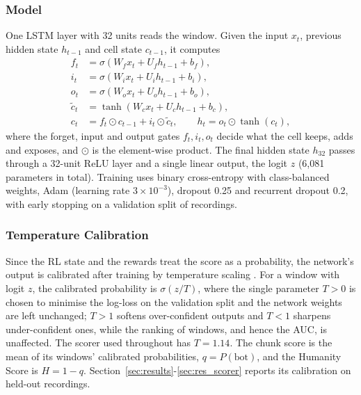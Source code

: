 \documentclass{ieeetj}
\begin{document}
\vspace{-15pt}
\subsubsection{Model}
One LSTM layer \cite{hochreiter_lstm_1997} with 32 units reads the window. Given the input $x_t$, previous hidden state $h_{t-1}$ and cell state $c_{t-1}$, it computes
\begin{equation}
\begin{aligned}
f_t &= \sigma(W_f x_t + U_f h_{t-1} + b_f),\\
i_t &= \sigma(W_i x_t + U_i h_{t-1} + b_i),\\
o_t &= \sigma(W_o x_t + U_o h_{t-1} + b_o),\\
\tilde c_t &= \tanh(W_c x_t + U_c h_{t-1} + b_c),\\
c_t &= f_t\odot c_{t-1} + i_t\odot\tilde c_t,\qquad h_t = o_t\odot\tanh(c_t),
\end{aligned}
\end{equation}
where the forget, input and output gates $f_t, i_t, o_t$ decide what the cell keeps, adds and exposes, and $\odot$ is the element-wise product. The final hidden state $h_{32}$ passes through a 32-unit ReLU layer and a single linear output, the logit $z$ (6{,}081 parameters in total). Training uses binary cross-entropy with class-balanced weights, Adam (learning rate $3\times10^{-3}$), dropout 0.25 and recurrent dropout 0.2, with early stopping on a validation split of recordings.

\vspace{-15pt}
\subsubsection{Temperature Calibration}
Since the RL state and the rewards treat the score as a probability, the network's output is calibrated after training by temperature scaling \cite{guo_calibration_2017}. For a window with logit $z$, the calibrated probability is $\sigma(z/T)$, where the single parameter $T>0$ is chosen to minimise the log-loss on the validation split and the network weights are left unchanged; $T>1$ softens over-confident outputs and $T<1$ sharpens under-confident ones, while the ranking of windows, and hence the AUC, is unaffected. The scorer used throughout has $T=1.14$. The chunk score is the mean of its windows' calibrated probabilities, $q=P(\text{bot})$, and the Humanity Score is $H=1-q$. Section~\ref{sec:results}-\ref{sec:res_scorer} reports its calibration on held-out recordings.
\end{document}
